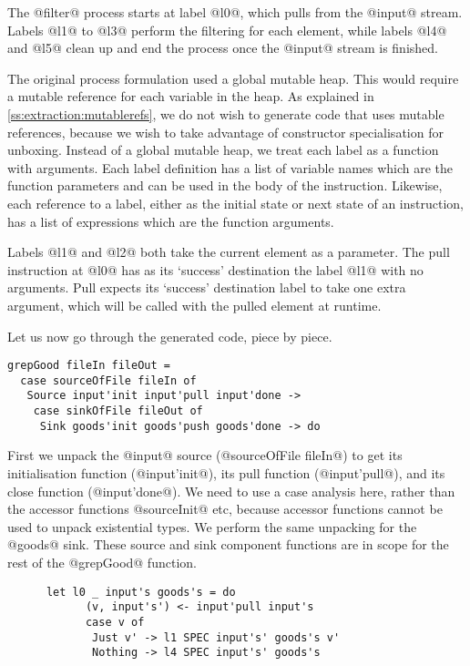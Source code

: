 The @filter@ process starts at label @l0@, which pulls from the @input@ stream.
Labels @l1@ to @l3@ perform the filtering for each element, while labels @l4@ and @l5@ clean up and end the process once the @input@ stream is finished.

The original process formulation  used a global mutable heap.
This would require a mutable reference for each variable in the heap.
As explained in \autoref{ss:extraction:mutablerefs}, we do not wish to generate code that uses mutable references, because we wish to take advantage of constructor specialisation for unboxing.
Instead of a global mutable heap, we treat each label as a function with arguments.
Each label definition has a list of variable names which are the function parameters and can be used in the body of the instruction.
Likewise, each reference to a label, either as the initial state or next state of an instruction, has a list of expressions which are the function arguments.

Labels @l1@ and @l2@ both take the current element as a parameter.
The pull instruction at @l0@ has as its `success' destination the label @l1@ with no arguments.
Pull expects its `success' destination label to take one extra argument, which will be called with the pulled element at runtime.

Let us now go through the generated code, piece by piece.

\begin{lstlisting}
grepGood fileIn fileOut =
  case sourceOfFile fileIn of
   Source input'init input'pull input'done ->
    case sinkOfFile fileOut of
     Sink goods'init goods'push goods'done -> do
\end{lstlisting}

First we unpack the @input@ source (@sourceOfFile fileIn@) to get its initialisation function (@input'init@), its pull function (@input'pull@), and its close function (@input'done@).
We need to use a case analysis here, rather than the accessor functions @sourceInit@ etc, because accessor functions cannot be used to unpack existential types.
We perform the same unpacking for the @goods@ sink.
These source and sink component functions are in scope for the rest of the @grepGood@ function.

\begin{lstlisting}
      let l0 _ input's goods's = do
            (v, input's') <- input'pull input's
            case v of
             Just v' -> l1 SPEC input's' goods's v'
             Nothing -> l4 SPEC input's' goods's
\end{lstlisting}


